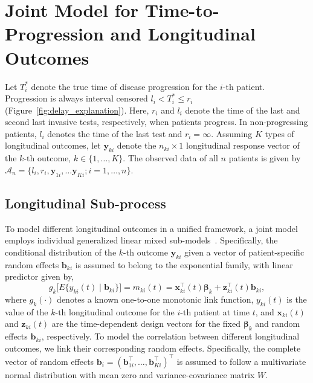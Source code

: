 \section{Joint Model for Time-to-Progression and Longitudinal Outcomes}
\label{sec:jointmodel}
Let $T_i^*$ denote the true time of disease progression for the ${i\mbox{-th}}$ patient. Progression is always interval censored ${l_i < T_i^* \leq r_i}$ (Figure~\ref{fig:delay_explanation}). Here, $r_i$ and $l_i$ denote the time of the last and second last invasive tests, respectively, when patients progress. In non-progressing patients, $l_i$ denotes the time of the last test and ${r_i=\infty}$. Assuming $K$ types of longitudinal outcomes, let $\boldsymbol{y}_{ki}$ denote the ${n_{ki} \times 1}$ longitudinal response vector of the ${k\mbox{-th}}$ outcome, $k \in \{1, \ldots, K\}$. The observed data of all $n$ patients is given by ${\mathcal{A}_n = \{l_i, r_i, \boldsymbol{y}_{1i},\ldots \boldsymbol{y}_{Ki}; i = 1, \ldots, n\}}$.

\subsection{Longitudinal Sub-process}
To model different longitudinal outcomes in a unified framework, a joint model employs individual generalized linear mixed sub-models~\citep{mcculloch2005generalized}. Specifically, the conditional distribution of the $k$-th outcome $\boldsymbol{y}_{ki}$ given a vector of patient-specific random effects $\boldsymbol{b}_{ki}$ is assumed to belong to the exponential family, with linear predictor given by,
\begin{equation*}
\label{eq:long_model}
g_k\big[E\{y_{ki} (t) \mid \boldsymbol{b}_{ki}\}\big] = m_{ki}(t) = \boldsymbol{x}_{ki}^{\top}(t)\boldsymbol{\beta}_{k} + \boldsymbol{z}_{ki}^{\top}(t)\boldsymbol{b}_{ki},
\end{equation*}
where $g_k(\cdot)$ denotes a known one-to-one monotonic link function, $y_{ki}(t)$ is the
value of the ${k\mbox{-th}}$ longitudinal outcome for the ${i\mbox{-th}}$ patient at time $t$, and $\boldsymbol{x}_{ki}(t)$ and $\boldsymbol{z}_{ki}(t)$ are the time-dependent design vectors for the fixed $\boldsymbol{\beta}_{k}$ and random effects $\boldsymbol{b}_{ki}$, respectively. To model the correlation between different longitudinal outcomes, we link their corresponding random effects. Specifically, the complete vector of random effects ${\boldsymbol{b}_{i} = (\boldsymbol{b}_{1i}^{\top}, \ldots, \boldsymbol{b}_{Ki}^{\top})^{\top}}$ is assumed to follow a multivariate normal distribution with mean zero and variance-covariance matrix $W$.

